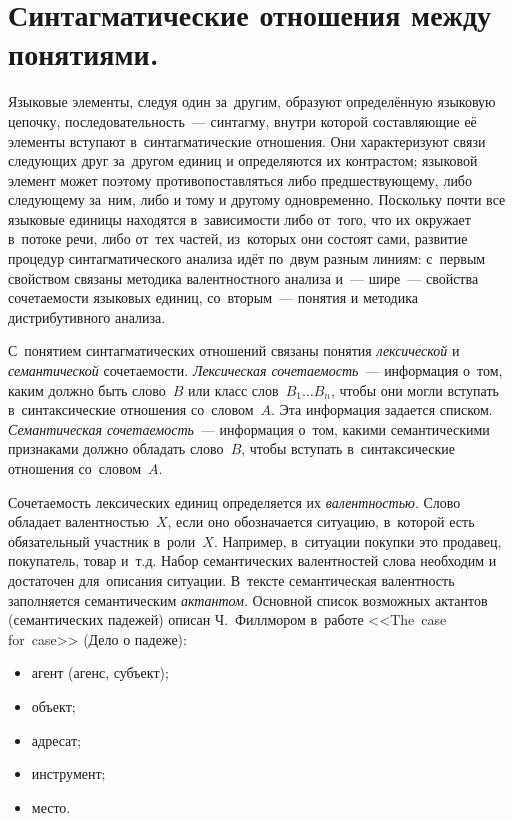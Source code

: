 \documentclass[12pt]{article}
\theoremstyle{definition}
\theoremstyle{remark}
\numberwithin{equation}{section}
\begin{document}
\section{Синтагматические отношения между понятиями.}
Языковые элементы, следуя один за~другим, образуют определённую
языковую цепочку, последовательность~--- синтагму, внутри которой
составляющие её элементы вступают в~синтагматические отношения.
Они характеризуют связи следующих друг за~другом единиц и определяются
их контрастом; языковой элемент может поэтому противопоставляться либо
предшествующему, либо следующему за~ним, либо и тому и другому одновременно.
Поскольку почти все языковые единицы находятся в~зависимости либо от~того,
что их окружает в~потоке речи, либо от~тех частей, из~которых они состоят
сами, развитие процедур синтагматического анализа идёт по~двум разным линиям:
с~первым свойством связаны методика валентностного анализа и~--- шире~---
свойства сочетаемости языковых единиц, со~вторым~--- понятия и методика
дистрибутивного анализа.

С~понятием синтагматических отношений связаны понятия \textsl{лексической}
и \textsl{семантической} сочетаемости. \textsl{Лексическая сочетаемость}~---
информация о~том, каким должно быть слово~$B$ или класс слов~$B_1 \dots B_n$,
чтобы они могли вступать в~синтаксические отношения со~словом~$A$.
Эта информация задается списком. \textsl{Семантическая сочетаемость}~---
информация о~том, какими семантическими признаками должно обладать
слово~$B$, чтобы вступать в~синтаксические отношения со~словом~$A$.

Сочетаемость лексических единиц определяется их \textsl{валентностью}.
Слово обладает валентностью~$X$, если оно обозначается ситуацию, в~которой
есть обязательный участник в~роли~$X$. Например, в~ситуации покупки
это продавец, покупатель, товар и~т.д. Набор семантических валентностей
слова необходим и достаточен для~описания ситуации. В~тексте
семантическая валентность заполняется семантическим \textsl{актантом}.
Основной список возможных актантов (семантических падежей) описан
Ч.~Филлмором в~работе <<The~case for~case>> (Дело о падеже):
\begin{itemize}
	\item агент (агенс, субъект);
	\item объект;
	\item адресат;
	\item инструмент;
	\item место.
\end{itemize}
\end{document}
